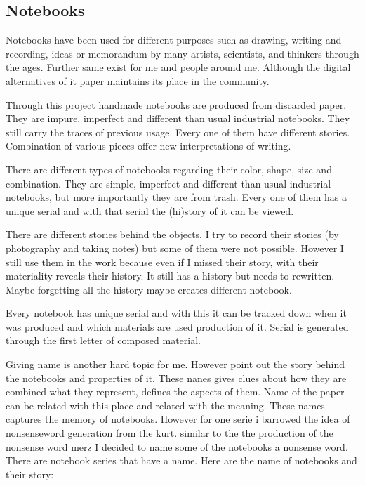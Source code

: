 %
%
\subsection{Notebooks}

Notebooks have been used for different purposes such as drawing, writing and recording, ideas or memorandum by many artists, scientists, and thinkers through the ages. Further same exist for me and people around me. Although the digital alternatives of it paper maintains its place in the community.

Through this project handmade notebooks are produced from discarded paper. They are impure, imperfect and different than usual industrial notebooks. They still carry the traces of previous usage. Every one of them have different stories. Combination of various pieces offer new interpretations of writing.

There are different types of notebooks regarding their color, shape, size and combination. They are simple, imperfect and different than usual industrial notebooks, but more importantly they are from trash. Every one of them has a unique serial and with that serial the (hi)story of it can be viewed.

There are different stories behind the objects. I try to record their stories (by photography and taking notes) but some of them were not possible. However I still use them in the work because even if I missed their story, with their materiality reveals their history. It still has a history but needs to rewritten. Maybe forgetting all the history maybe creates different notebook.

Every notebook has unique serial and with this it can be tracked down when it was produced and which materials are used production of it. Serial is generated through the first letter of composed material. 

Giving name is another hard topic for me. However point out the story behind the notebooks and properties of it. These nanes gives clues about how they are combined what they represent, defines the aspects of them. Name of the paper can be related with this place and related with the meaning. These names captures the memory of notebooks. However for one serie i barrowed the idea of nonsenseword generation from the kurt. similar to the the production of the nonsense word merz I decided to name some of the notebooks a nonsense word. There are notebook series that have a name. Here are the name of notebooks and their story:

